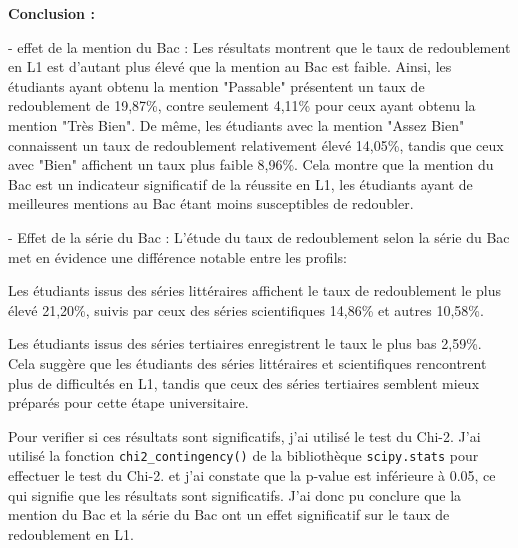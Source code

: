\textcolor{red}{\faInfoCircle}\textbf{Conclusion :}


- effet de la mention du Bac : 
    Les résultats montrent que le taux de redoublement en L1 est d'autant plus élevé que la mention au Bac est faible. Ainsi, les étudiants ayant obtenu la mention "Passable" présentent un taux de redoublement de 19,87\%, contre seulement 4,11\% pour ceux ayant obtenu la mention "Très Bien". De même, les étudiants avec la mention "Assez Bien" connaissent un taux de redoublement relativement élevé 14,05\%, tandis que ceux avec "Bien" affichent un taux plus faible 8,96\%.
Cela montre que la mention du Bac est un indicateur significatif de la réussite en L1, les étudiants ayant de meilleures mentions au Bac étant moins susceptibles de redoubler.

- Effet de la série du Bac : 
L'étude du taux de redoublement selon la série du Bac met en évidence une différence notable entre les profils:

Les étudiants issus des séries littéraires affichent le taux de redoublement le plus élevé 21,20\%, suivis par ceux des séries scientifiques 14,86\% et autres 10,58\%.

Les étudiants issus des séries tertiaires enregistrent le taux le plus bas 2,59\%. Cela suggère que les étudiants des séries littéraires et scientifiques rencontrent plus de difficultés en L1, tandis que ceux des séries tertiaires semblent mieux préparés pour cette étape universitaire. 

Pour verifier si ces résultats sont significatifs, j'ai utilisé le test du Chi-2.
J'ai utilisé la fonction \texttt{chi2\_contingency()} de la bibliothèque \texttt{scipy.stats} pour effectuer le test du Chi-2.
et j'ai constate que la p-value est inférieure à 0.05, ce qui signifie que les résultats sont significatifs.
J'ai donc pu conclure que la mention du Bac et la série du Bac ont un effet significatif sur le taux de redoublement en L1.

\vspace{1cm}  


